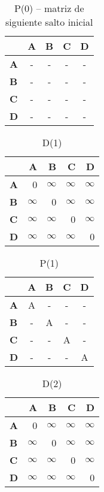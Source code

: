 \documentclass{article}
\newcommand{\INF}{$\infty$}
\begin{document}
\begin{table}[H]\centering
\caption{P(0) -- matriz de siguiente salto inicial}
\begin{tabular}{l c c c c}
\toprule
 & \textbf{A} & \textbf{B} & \textbf{C} & \textbf{D}\\\midrule
\textbf{A} & - & - & - & - \\
\textbf{B} & - & - & - & - \\
\textbf{C} & - & - & - & - \\
\textbf{D} & - & - & - & - \\
\bottomrule
\end{tabular}
\end{table}

\begin{table}[H]\centering
\caption{D(1)}
\begin{tabular}{l r r r r}
\toprule
 & \textbf{A} & \textbf{B} & \textbf{C} & \textbf{D}\\\midrule
\textbf{A} & 0 & \INF & \INF & \INF \\
\textbf{B} & \INF & 0 & \INF & \INF \\
\textbf{C} & \INF & \INF & 0 & \INF \\
\textbf{D} & \INF & \INF & \INF & 0 \\
\bottomrule
\end{tabular}
\end{table}

\begin{table}[H]\centering
\caption{P(1)}
\begin{tabular}{l c c c c}
\toprule
 & \textbf{A} & \textbf{B} & \textbf{C} & \textbf{D}\\\midrule
\textbf{A} & \cellcolor{yellow!30}A & - & - & - \\
\textbf{B} & - & \cellcolor{yellow!30}A & - & - \\
\textbf{C} & - & - & \cellcolor{yellow!30}A & - \\
\textbf{D} & - & - & - & \cellcolor{yellow!30}A \\
\bottomrule
\end{tabular}
\end{table}

\begin{table}[H]\centering
\caption{D(2)}
\begin{tabular}{l r r r r}
\toprule
 & \textbf{A} & \textbf{B} & \textbf{C} & \textbf{D}\\\midrule
\textbf{A} & 0 & \INF & \INF & \INF \\
\textbf{B} & \INF & 0 & \INF & \INF \\
\textbf{C} & \INF & \INF & 0 & \INF \\
\textbf{D} & \INF & \INF & \INF & 0 \\
\bottomrule
\end{tabular}
\end{table}
\end{document}
